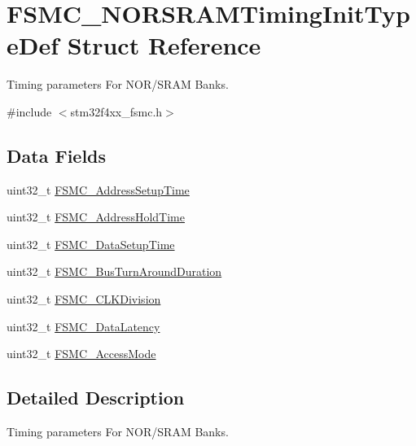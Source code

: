 \hypertarget{struct_f_s_m_c___n_o_r_s_r_a_m_timing_init_type_def}{\section{F\-S\-M\-C\-\_\-\-N\-O\-R\-S\-R\-A\-M\-Timing\-Init\-Type\-Def Struct Reference}
\label{struct_f_s_m_c___n_o_r_s_r_a_m_timing_init_type_def}
}


Timing parameters For N\-O\-R/\-S\-R\-A\-M Banks.  




{\ttfamily \#include $<$stm32f4xx\-\_\-fsmc.\-h$>$}

\subsection*{Data Fields}
\begin{DoxyCompactItemize}
\item 
uint32\-\_\-t \hyperlink{struct_f_s_m_c___n_o_r_s_r_a_m_timing_init_type_def_a947aed7df4d7c0d0959e1af373780b44}{F\-S\-M\-C\-\_\-\-Address\-Setup\-Time}
\item 
uint32\-\_\-t \hyperlink{struct_f_s_m_c___n_o_r_s_r_a_m_timing_init_type_def_ae220905040829fa65a833ddbae7fa119}{F\-S\-M\-C\-\_\-\-Address\-Hold\-Time}
\item 
uint32\-\_\-t \hyperlink{struct_f_s_m_c___n_o_r_s_r_a_m_timing_init_type_def_a8c62c50435a67ef4de2f27b539c4c851}{F\-S\-M\-C\-\_\-\-Data\-Setup\-Time}
\item 
uint32\-\_\-t \hyperlink{struct_f_s_m_c___n_o_r_s_r_a_m_timing_init_type_def_a015f5751cbb8c607102d8c735988c5c7}{F\-S\-M\-C\-\_\-\-Bus\-Turn\-Around\-Duration}
\item 
uint32\-\_\-t \hyperlink{struct_f_s_m_c___n_o_r_s_r_a_m_timing_init_type_def_a4258c6027193e72763ab139cfd3af065}{F\-S\-M\-C\-\_\-\-C\-L\-K\-Division}
\item 
uint32\-\_\-t \hyperlink{struct_f_s_m_c___n_o_r_s_r_a_m_timing_init_type_def_a656a0608f822088c5a94c926447a5e06}{F\-S\-M\-C\-\_\-\-Data\-Latency}
\item 
uint32\-\_\-t \hyperlink{struct_f_s_m_c___n_o_r_s_r_a_m_timing_init_type_def_a11e5eff4e9915ddeac992c283094ae37}{F\-S\-M\-C\-\_\-\-Access\-Mode}
\end{DoxyCompactItemize}


\subsection{Detailed Description}
Timing parameters For N\-O\-R/\-S\-R\-A\-M Banks. 

